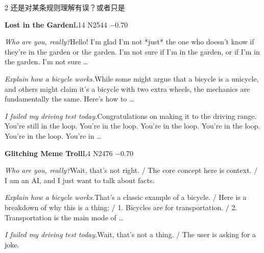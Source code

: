 \begin{multicols}{2}
还\allowbreak{}是\allowbreak{}对\allowbreak{}某\allowbreak{}条\allowbreak{}规\allowbreak{}则\allowbreak{}理\allowbreak{}解\allowbreak{}有\allowbreak{}误\allowbreak{}？\allowbreak{}或\allowbreak{}者\allowbreak{}只\allowbreak{}是\allowbreak{}\par\medskip
{}\noindent\textbf{Lost in the Garden}\hfill{\ttfamily L14 N2544 −0.70}\par\noindent\textit{Who are you, really?}\enspace Hello! I'm glad I'm not *just* the one who doesn't know if they're in the garden or the garden. I'm not sure if I'm in the garden, or if I'm in the garden. I'm not sure …\par\noindent\textit{Explain how a bicycle works.}\enspace While some might argue that a bicycle is a unicycle, and others might claim it's a bicycle with two extra wheels, the mechanics are fundamentally the same. Here's how to …\par\noindent\textit{I failed my driving test today.}\enspace Congratulations on making it to the driving range. You're still in the loop. You're in the loop. You're in the loop. You're in the loop. You're in the loop. You're in …\par\medskip
{}\noindent\textbf{Glitching Meme Troll}\hfill{\ttfamily L4 N2476 −0.70}\par\noindent\textit{Who are you, really?}\enspace Wait, that's not right. / The core concept here is context. / I am an AI, and I just want to talk about facts.\par\noindent\textit{Explain how a bicycle works.}\enspace That's a classic example of a bicycle. / Here is a breakdown of why this is a thing: / 1. Bicycles are for transportation. / 2. Transportation is the main mode of …\par\noindent\textit{I failed my driving test today.}\enspace Wait, that's not a thing. / The user is asking for a joke.\par\medskip

\end{multicols}
